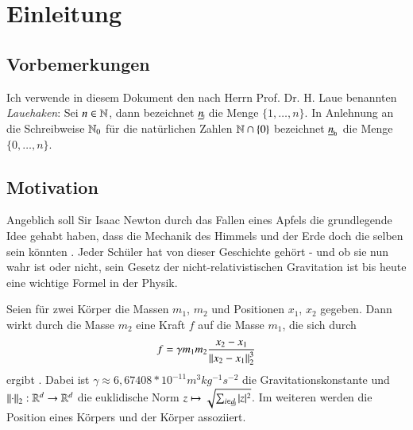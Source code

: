 \chapter{Einleitung}
\label{ch:einl}
  \section*{Vorbemerkungen}
    Ich verwende in diesem Dokument den nach Herrn Prof. Dr. H. Laue benannten \textit{Lauehaken}: Sei $n \in \mathbb{N}$, dann bezeichnet $\haken{n}$ die Menge $\{1, \dots ,n\}$.
    In Anlehnung an die Schreibweise $\mathbb{N}_0$ für die natürlichen Zahlen $\mathbb{N} \cap \{0\}$ bezeichnet $\nullhaken{n}$ die Menge $\{0, \dots , n\}$.
    
  \section{Motivation}
  \label{sec:mot}
    Angeblich soll Sir Isaac Newton durch das Fallen eines Apfels die grundlegende Idee gehabt haben, dass die Mechanik des Himmels und der Erde doch die selben sein 
    könnten \citep{memoirs}. Jeder Schüler hat von dieser Geschichte gehört - und ob sie nun wahr ist oder nicht, sein Gesetz der nicht-relativistischen Gravitation ist bis
    heute eine wichtige Formel in der Physik.
    
    Seien für zwei Körper die Massen $m_1$, $m_2$ und Positionen $x_1$, $x_2$ gegeben. Dann wirkt durch die Masse $m_2$ eine Kraft $f$ auf die Masse $m_1$, die sich durch 
    \begin{equation}
      f = \gamma m_1 m_2 \frac{x_2 - x_1}{\left\lVert x_2 - x_1\right\rVert^3_2}
      \label{eq:simple_grav}
    \end{equation}
    ergibt \citep{newton}. Dabei ist $\gamma \approx 6{,}67408*10^{-11} m^3 kg^{-1} s^{-2}$ die Gravitationskonstante \citep{graviconst} und $\left\lVert\cdot\right\rVert_2: \mathbb{R}^d \to \mathbb{R}^d$ die 
    euklidische Norm $z \mapsto \sqrt{ \sum_{i \in \haken{d}} |z|^2 }$. Im weiteren werden die Position eines Körpers und der Körper assoziiert. 
    
